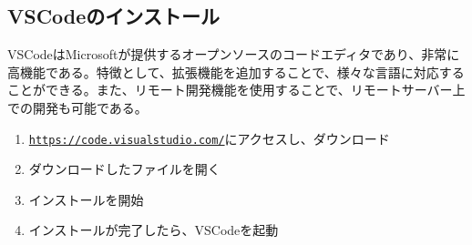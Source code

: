 \documentclass[a4paper, 11pt, dvipdfmx]{jsarticle}
\begin{document}
\subsection{VSCodeのインストール}
  VSCodeはMicrosoftが提供するオープンソースのコードエディタであり、非常に高機能である。特徴として、拡張機能を追加することで、様々な言語に対応することができる。また、リモート開発機能を使用することで、リモートサーバー上での開発も可能である。
  \begin{enumerate}
    \item \href{https://code.visualstudio.com/}{\texttt{https://code.visualstudio.com/}}にアクセスし、ダウンロード
    \item ダウンロードしたファイルを開く
    \item インストールを開始
    \item インストールが完了したら、VSCodeを起動
  \end{enumerate}
\end{document}
